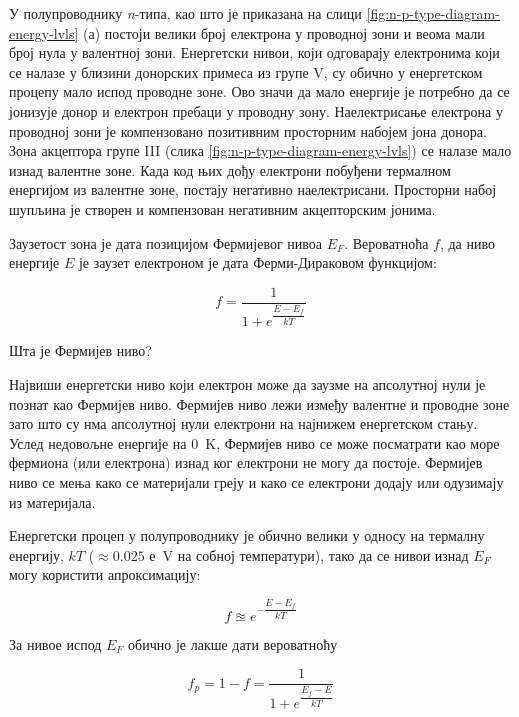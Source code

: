 \documentclass{article}
\begin{document}
У полупроводнику \textit{n}-типа, као што је приказана на слици \ref{fig:n-p-type-diagram-energy-lvls} (а) постоји велики број електрона у проводној зони и веома мали број нула у валентној зони. Енергетски нивои, који одговарају електронима који се налазе у близини донорских примеса из групе V, су обично у енергетском процепу мало испод проводне зоне. Ово значи да мало енергије је потребно да се јонизује донор и електрон пребаци у проводну зону. Наелектрисање електрона у проводној зони је компензовано позитивним просторним набојем јона донора. Зона акцептора групе III (слика \ref{fig:n-p-type-diagram-energy-lvls}) се налазе мало изнад валентне зоне. Када код њих дођу електрони побуђени термалном енергијом из валентне зоне, постају негативно наелектрисани. Просторни набој шупљина је створен и компензован негативним акцепторским јонима. 

Заузетост зона је дата позицијом Фермијевог нивоа $E_F$. Вероватноћа $f$, да ниво енергије $E$ је заузет електроном је дата Ферми-Дираковом функцијом:

\begin{equation}
    f = \dfrac{1}{1+e^{\dfrac{E-E_f}{kT}} }
\end{equation}

\begin{info}
	Шта је Фермијев ниво?

	Највиши енергетски ниво који електрон може да заузме на апсолутној нули је познат као Фермијев ниво. Фермијев ниво лежи између валентне и проводне зоне зато што су нма апсолутној нули електрони на најнижем енергетском стању. Услед недовољне енергије на \SI{0}{\kelvin}, Фермијев ниво се може посматрати као море фермиона (или електрона) изнад ког електрони не могу да постоје. Фермијев ниво се мења како се материјали греју и како се електрони додају или одузимају из материјала. 

\end{info} %

Енергетски процеп у полупроводнику је обично велики у односу на термалну енергију, $kT$ ($\approx 0.025$ е\SI{}{\volt} на собној температури), тако да се нивои изнад $E_F$ могу користити апроксимацију:

\begin{equation}
    f \approxeq e^{-\dfrac{E-E_f}{kT}}
\end{equation}

За нивое испод $E_F$ обично је лакше дати вероватноћу 

\begin{equation}
	f_p = 1-f = \dfrac{1}{1+e^{\dfrac{E_f-E}{kT}}}
\end{equation}
\end{document}
